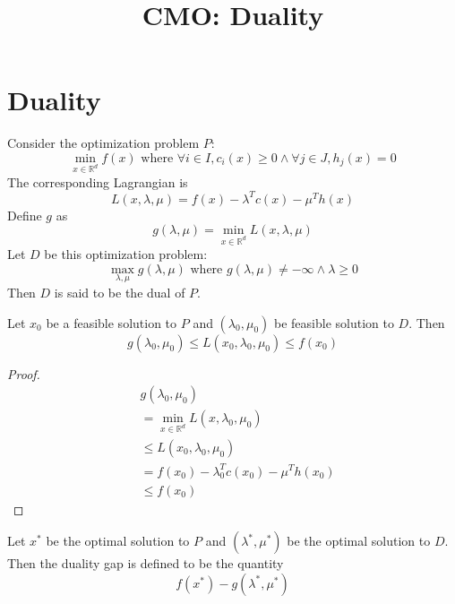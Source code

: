 
\usepackage{algorithm}
\usepackage{algpseudocode}

\newcommand\numberthis{\addtocounter{equation}{1}\tag{\theequation}}
\DeclareMathOperator*{\argminset}{argminset}

\title{CMO: Duality}



\maketitle
\initMinimal{}

\section{Duality}

Consider the optimization problem $P$:
\[ \min_{x \in \mathbb{R}^d} f(x) \textrm{ where } \forall i \in I, c_i(x) \ge 0 \wedge \forall j \in J, h_j(x) = 0 \]
The corresponding Lagrangian is
\[ L(x, \lambda, \mu) = f(x) - \lambda^Tc(x) - \mu^Th(x) \]
Define $g$ as
\[ g(\lambda, \mu) = \min_{x \in \mathbb{R}^d} L(x, \lambda, \mu) \]
Let $D$ be this optimization problem:
\[ \max_{\lambda, \mu} g(\lambda, \mu) \textrm{ where } g(\lambda, \mu) \neq -\infty \wedge \lambda \ge 0 \]
Then $D$ is said to be the dual of $P$.

\begin{theorem}
Let $x_0$ be a feasible solution to $P$ and $(\lambda_0, \mu_0)$ be feasible solution to $D$. Then
\[ g(\lambda_0, \mu_0) \le L(x_0, \lambda_0, \mu_0) \le f(x_0) \]
\end{theorem}
\begin{proof}
\begin{align*}
& g(\lambda_0, \mu_0)
\\ &= \min_{x \in \mathbb{R}^d} L(x, \lambda_0, \mu_0)
\\ &\le L(x_0, \lambda_0, \mu_0)
\\ &= f(x_0) - \lambda_0^Tc(x_0) - \mu^Th(x_0)
\\ &\le f(x_0) \tag{$\lambda_0 \ge 0 \wedge c(x_0) \ge 0 \wedge h(x_0) = 0$ by feasibility}
\end{align*}
\end{proof}

\begin{definition}
Let $x^*$ be the optimal solution to $P$ and $(\lambda^*, \mu^*)$ be the optimal solution to $D$.
Then the duality gap is defined to be the quantity
\[ f(x^*) - g(\lambda^*, \mu^*) \]
\end{definition}

